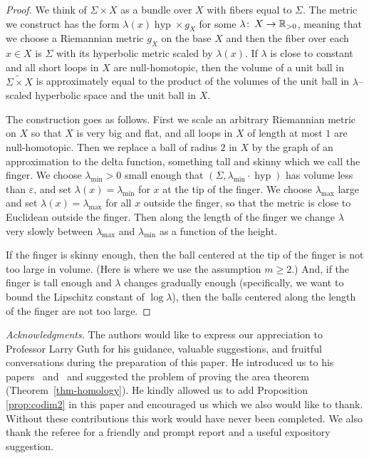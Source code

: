 \documentclass[12pt]{amsart}
\numberwithin{equation}{section}
\begin{document}
\begin{proof}
We think of 
$\Sigma \times X$ as a bundle over $X$ with fibers equal to $\Sigma$.  The metric we construct has the form $\lambda(x) \operatorname{hyp} \times g_X$ for some $\lambda {\colon\thinspace} X \rightarrow \mathbb{R}_{> 0}$, meaning that we choose a Riemannian metric $g_X$ on the base $X$ and then the fiber over each $x \in X$ is $\Sigma$ with its hyperbolic metric scaled by $\lambda(x)$.  If $\lambda$ is close to constant and all short loops in $X$ are null-homotopic, then the volume of a unit ball in $\widetilde{\Sigma \times X}$ is approximately equal to the product of the volumes of the unit ball in $\lambda$--scaled hyperbolic space and the unit ball in $X$.

The construction goes as follows.  First we scale an arbitrary Riemannian metric on $X$ so that $X$ is very big and flat, and all loops in $X$ of length at most $1$ are null-homotopic.  Then we replace a ball of radius $2$ in $X$ by the graph of an approximation to the delta function, something tall and skinny which we call the finger.  We choose $\lambda_{\min} > 0$ small enough that $(\Sigma, \lambda_{\min} \cdot \operatorname{hyp})$ has volume less than $\varepsilon$, and set $\lambda(x) = \lambda_{\min}$ for $x$ at the tip of the finger.  We choose $\lambda_{\max}$ large and set $\lambda(x) = \lambda_{\max}$ for all $x$ outside the finger, so that the metric is close to Euclidean outside the finger.  Then along the length of the finger we change $\lambda$ very slowly between $\lambda_{\max}$ and $\lambda_{\min}$ as a function of the height.

If the finger is skinny enough, then the ball centered at the tip of the finger is not too large in volume.  (Here is where we use the assumption $m \geq 2$.)  And, if the finger is tall enough and $\lambda$ changes gradually enough (specifically, we want to bound the Lipschitz constant of $\log \lambda$), then the balls centered along the length of the finger are not too large.
\end{proof}

{\it Acknowledgments.} The authors would like to express our appreciation to Professor
Larry Guth for his guidance, valuable suggestions, and fruitful
conversations during the preparation of this paper. He introduced us to his papers~\cite{Guth11} and~\cite{Guth10} and suggested the problem of proving the area theorem (Theorem~\ref{thm-homology}).  He kindly allowed us to add Proposition \ref{prop:codim2} in this paper and encouraged us which we also would like to thank. Without these contributions this work would have never been completed.  We also thank the referee for a friendly and prompt report and a useful expository suggestion.
\end{document}
